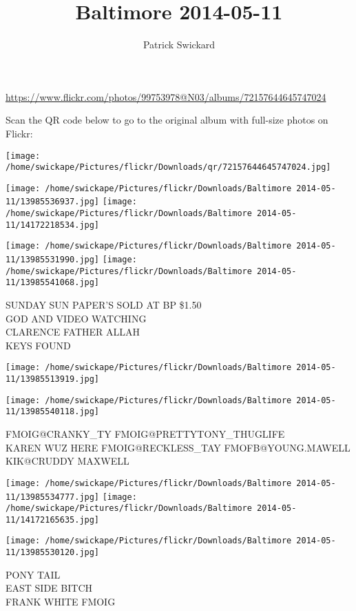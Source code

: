 \documentclass[10pt,letterpaper]{article}
\title{Baltimore 2014-05-11}
\author{Patrick Swickard}
\date{}
\begin{document}
\maketitle

\url{https://www.flickr.com/photos/99753978@N03/albums/72157644645747024}

Scan the QR code below to go to the original album with full-size photos on Flickr:

\texttt{[image: /home/swickape/Pictures/flickr/Downloads/qr/72157644645747024.jpg]}
\pagebreak

\texttt{[image: /home/swickape/Pictures/flickr/Downloads/Baltimore 2014-05-11/13985536937.jpg]}
\texttt{[image: /home/swickape/Pictures/flickr/Downloads/Baltimore 2014-05-11/14172218534.jpg]}

\texttt{[image: /home/swickape/Pictures/flickr/Downloads/Baltimore 2014-05-11/13985531990.jpg]}
\texttt{[image: /home/swickape/Pictures/flickr/Downloads/Baltimore 2014-05-11/13985541068.jpg]}

SUNDAY SUN PAPER'S SOLD AT BP \$1.50\\
GOD AND VIDEO WATCHING\\
CLARENCE FATHER ALLAH\\
KEYS FOUND
\pagebreak

\texttt{[image: /home/swickape/Pictures/flickr/Downloads/Baltimore 2014-05-11/13985513919.jpg]}

\vspace{0.25in}
\texttt{[image: /home/swickape/Pictures/flickr/Downloads/Baltimore 2014-05-11/13985540118.jpg]}

FMOIG@CRANKY\_TY FMOIG@PRETTYTONY\_THUGLIFE\\
KAREN WUZ HERE FMOIG@RECKLESS\_TAY FMOFB@YOUNG.MAWELL KIK@CRUDDY MAXWELL
\pagebreak

\texttt{[image: /home/swickape/Pictures/flickr/Downloads/Baltimore 2014-05-11/13985534777.jpg]}
\texttt{[image: /home/swickape/Pictures/flickr/Downloads/Baltimore 2014-05-11/14172165635.jpg]}

\vspace{0.25in}
\texttt{[image: /home/swickape/Pictures/flickr/Downloads/Baltimore 2014-05-11/13985530120.jpg]}

PONY TAIL\\
EAST SIDE BITCH\\
FRANK WHITE FMOIG
\pagebreak
\end{document}
